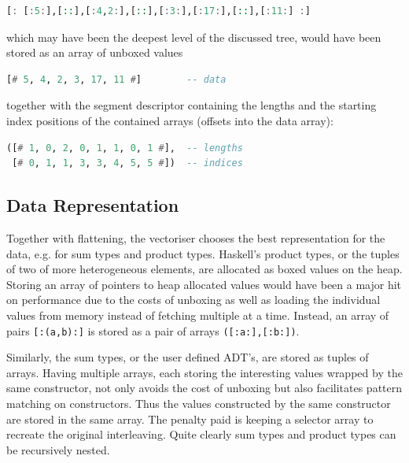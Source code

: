\documentclass[preamble.tex]{subfiles}
\begin{document}
\begin{lstlisting}[basicstyle={\ttfamily},language=Haskell]
[: [:5:],[::],[:4,2:],[::],[:3:],[:17:],[::],[:11:] :]
\end{lstlisting}


which may have been the deepest level of the discussed tree, would have been stored as an array of unboxed values

\begin{lstlisting}[basicstyle={\ttfamily},language=Haskell]
[# 5, 4, 2, 3, 17, 11 #]        -- data
\end{lstlisting}


together with the segment descriptor containing the lengths and the starting index positions of the contained arrays (offsets into the data array):

\begin{lstlisting}[basicstyle={\ttfamily},language=Haskell]
([# 1, 0, 2, 0, 1, 1, 0, 1 #],  -- lengths
 [# 0, 1, 1, 3, 3, 4, 5, 5 #])  -- indices
\end{lstlisting}



\subsection{\label{sub:DPH-Data-Repr}Data Representation}

Together with flattening, the vectoriser chooses the best representation for the data, e.g. for sum types and product types. Haskell's product types, or the tuples of two of more heterogeneous elements, are allocated as boxed values on the heap. Storing an array of pointers to heap allocated values would have been a major hit on performance due to the costs of unboxing as well as loading the individual values from memory instead of fetching multiple at a time. Instead, an array of pairs \texttt{{[}:(a,b):{]}} is stored as a pair of arrays \texttt{({[}:a:{]},{[}:b:{]})}.

Similarly, the sum types, or the user defined ADT's, are stored as tuples of arrays. Having multiple arrays, each storing the interesting values wrapped by the same constructor, not only avoids the cost of unboxing but also facilitates pattern matching on constructors. Thus the values constructed by the same constructor are stored in the same array. The penalty paid is keeping a selector array to recreate the original interleaving. Quite clearly sum types and product types can be recursively nested.%

\end{document}
